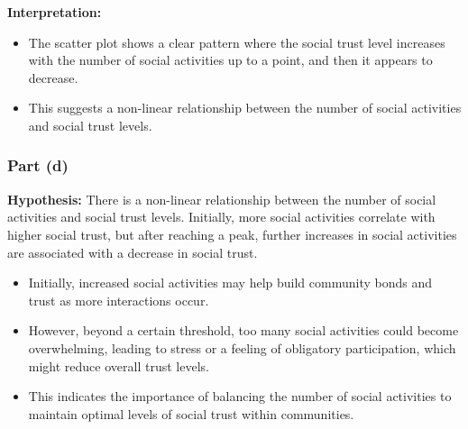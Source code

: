 \documentclass[
  11pt,
]{article}
\providecommand{\tightlist}{%
  \setlength{\itemsep}{0pt}\setlength{\parskip}{0pt}}
\begin{document}
\textbf{Interpretation:}

\begin{itemize}
\tightlist
\item
  The scatter plot shows a clear pattern where the social trust level
  increases with the number of social activities up to a point, and then
  it appears to decrease.
\item
  This suggests a non-linear relationship between the number of social
  activities and social trust levels.
\end{itemize}

\subsubsection{Part (d)}\label{part-d}

\textbf{Hypothesis:} There is a non-linear relationship between the
number of social activities and social trust levels. Initially, more
social activities correlate with higher social trust, but after reaching
a peak, further increases in social activities are associated with a
decrease in social trust.

\begin{itemize}
\tightlist
\item
  Initially, increased social activities may help build community bonds
  and trust as more interactions occur.
\item
  However, beyond a certain threshold, too many social activities could
  become overwhelming, leading to stress or a feeling of obligatory
  participation, which might reduce overall trust levels.
\item
  This indicates the importance of balancing the number of social
  activities to maintain optimal levels of social trust within
  communities.
\end{itemize}
\end{document}
